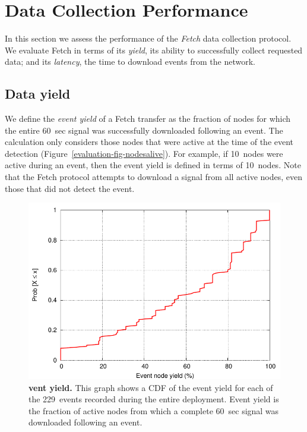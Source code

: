 \section{Data Collection Performance}
\label{evaluation-sec-performance}

In this section we assess the performance of the {\em Fetch} data collection
protocol. We evaluate Fetch in terms of its {\em yield}, its ability to
successfully collect requested data; and its {\em latency}, the time to
download events from the network.

\subsection{Data yield}

We define the {\em event yield} of a Fetch transfer as the fraction of nodes
for which the entire 60~sec signal was successfully downloaded following an
event. The calculation only considers those nodes that were active at the
time of the event detection (Figure~\ref{evaluation-fig-nodesalive}).  For
example, if 10~nodes were active during an event, then the event yield is
defined in terms of 10~nodes.  Note that the Fetch protocol attempts to
download a signal from all active nodes, even those that did not detect the
event.

\begin{figure}[t]
\label{evaluation-fig-compBlockYieldCDF}
\begin{center}
\includegraphics[width=\hsize]{./5-evaluation/figs/performance/yields/comparison/availableEventNodeYieldCDF.pdf}
\end{center}
\caption{\textbf{vent yield.}
This graph shows a CDF of the event yield for each of the 229~events recorded
during the entire deployment. Event yield is the fraction of active nodes
from which a complete 60~sec signal was downloaded following an event.}
\end{figure}

